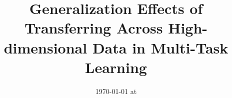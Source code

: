 \documentclass{article}
\begin{document}
\title{Generalization Effects of Transferring Across High-dimensional Data in Multi-Task Learning}
\date{}
\maketitle
\date{{\ddmmyyyydate\today} at \currenttime}












\appendix







\end{document}
